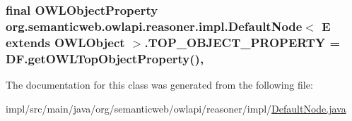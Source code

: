 \hypertarget{classorg_1_1semanticweb_1_1owlapi_1_1reasoner_1_1impl_1_1_default_node_3_01_e_01extends_01_o_w_l_object_01_4_a5a1e5e8eddd7be03848e28c8d41e5431}{
\subsubsection[{T\-O\-P\-\_\-\-O\-B\-J\-E\-C\-T\-\_\-\-P\-R\-O\-P\-E\-R\-T\-Y}]{\setlength{\rightskip}{0pt plus 5cm}final {\bf O\-W\-L\-Object\-Property} org.\-semanticweb.\-owlapi.\-reasoner.\-impl.\-Default\-Node$<$ E extends {\bf O\-W\-L\-Object} $>$.T\-O\-P\-\_\-\-O\-B\-J\-E\-C\-T\-\_\-\-P\-R\-O\-P\-E\-R\-T\-Y = D\-F.\-get\-O\-W\-L\-Top\-Object\-Property()\hspace{0.3cm}{\ttfamily [static]}, {\ttfamily [protected]}}}\label{classorg_1_1semanticweb_1_1owlapi_1_1reasoner_1_1impl_1_1_default_node_3_01_e_01extends_01_o_w_l_object_01_4_a5a1e5e8eddd7be03848e28c8d41e5431}


The documentation for this class was generated from the following file\-:\begin{DoxyCompactItemize}
\item 
impl/src/main/java/org/semanticweb/owlapi/reasoner/impl/\hyperlink{_default_node_8java}{Default\-Node.\-java}\end{DoxyCompactItemize}
